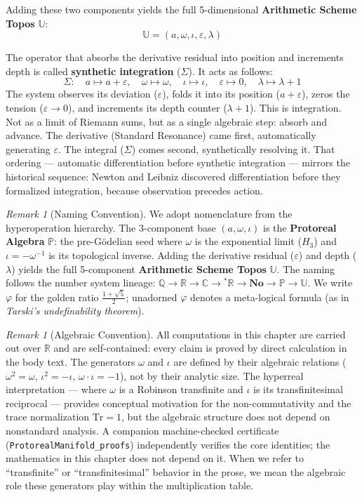\documentclass[12pt,oneside]{article}
\theoremstyle{principia}
\theoremstyle{definition}
\theoremstyle{remark}
\newtheorem{remark}[theorem]{Remark}
\providecommand{\UU}{\mathbb{U}}
\providecommand{\PP}{\mathbb{P}}
\providecommand{\RR}{\mathbb{R}}
\providecommand{\CC}{\mathbb{C}}
\providecommand{\QQ}{\mathbb{Q}}
\providecommand{\vp}{\varphi}
\providecommand{\eps}{\varepsilon}
\providecommand{\lam}{\lambda}
\begin{document}
Adding these two components yields the full 5-dimensional \textbf{Arithmetic Scheme Topos} $\UU$:
$$\UU = (a, \omega, \iota, \eps, \lam)$$

The operator that absorbs the derivative residual into position and increments depth is called \textbf{synthetic integration} ($\Sigma$). It acts as follows:
$$\Sigma: \quad a \mapsto a + \eps, \quad \omega \mapsto \omega, \quad \iota \mapsto \iota, \quad \eps \mapsto 0, \quad \lam \mapsto \lam + 1$$
The system observes its deviation ($\eps$), folds it into its position ($a + \eps$), zeros the tension ($\eps \to 0$), and increments its depth counter ($\lam + 1$). This is integration. Not as a limit of Riemann sums, but as a single algebraic step: absorb and advance. The derivative (Standard Resonance) came first, automatically generating $\eps$. The integral ($\Sigma$) comes second, synthetically resolving it. That ordering --- automatic differentiation before synthetic integration --- mirrors the historical sequence: Newton and Leibniz discovered differentiation before they formalized integration, because observation precedes action.

\begin{remark}[Naming Convention]\label{rem:hyper-tower}
We adopt nomenclature from the hyperoperation hierarchy. The 3-component base $(a, \omega, \iota)$ is the \textbf{Protoreal Algebra} $\PP$: the pre-G\"odelian seed where $\omega$ is the exponential limit ($H_3$) and $\iota = -\omega^{-1}$ is its topological inverse. Adding the derivative residual ($\eps$) and depth ($\lam$) yields the full 5-component \textbf{Arithmetic Scheme Topos} $\UU$. The naming follows the number system lineage: $\QQ \to \RR \to \CC \to {}^*\!\RR \to \mathbf{No} \to \PP \to \UU$. We write $\vp$ for the golden ratio $\tfrac{1+\sqrt{5}}{2}$; unadorned $\varphi$ denotes a meta-logical formula (as in \emph{Tarski's undefinability theorem}).
\end{remark}

\begin{remark}[Algebraic Convention]\label{rem:convention}
All computations in this chapter are carried out over $\RR$ and are
self-contained: every claim is proved by direct calculation in the body
text. The generators $\omega$ and $\iota$ are defined by their algebraic
relations ($\omega^2 = \omega$, $\iota^2 = -\iota$,
$\omega \cdot \iota = -1$), not by their analytic size. The hyperreal
interpretation --- where $\omega$ is a Robinson transfinite and $\iota$
is its transfinitesimal reciprocal --- provides conceptual motivation
for the non-commutativity and the trace normalization $\mathrm{Tr} = 1$,
but the algebraic structure does not depend on nonstandard analysis.
A companion machine-checked certificate
(\texttt{ProtorealManifold\_proofs}) independently verifies the
core identities; the mathematics in this chapter does not depend on it.
When we refer to ``transfinite'' or ``transfinitesimal'' behavior in the
prose, we mean the algebraic role these generators play within the
multiplication table.
\end{remark}
\end{document}
